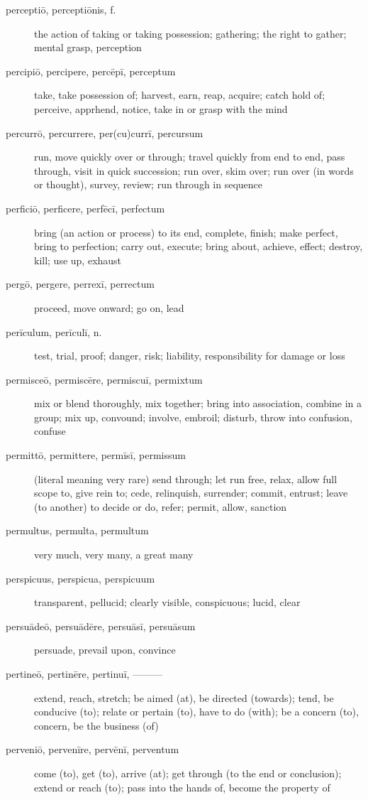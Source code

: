 \begin{description}
    \item[perceptiō, perceptiōnis, f.] the action of taking or taking possession; gathering; the right to gather; mental grasp, perception
    \item[percipiō, percipere, percēpī, perceptum] take, take possession of; harvest, earn, reap, acquire; catch hold of; perceive, apprhend, notice, take in or grasp with the mind
    \item[percurrō, percurrere, per(cu)currī, percursum] run, move quickly over or through; travel quickly from end to end, pass through, visit in quick succession; run over, skim over; run over (in words or thought), survey, review; run through in sequence
    \item[perficiō, perficere, perfēcī, perfectum] bring (an action or process) to its end, complete, finish; make perfect, bring to perfection; carry out, execute; bring about, achieve, effect; destroy, kill; use up, exhaust
    \item[pergō, pergere, perrexī, perrectum] \marginnote{*}proceed, move onward; go on, lead
    \item[perīculum, perīculī, n.] \marginnote{*}test, trial, proof; danger, risk; liability, responsibility for damage or loss
    \item[permisceō, permiscēre, permiscuī, permixtum] mix or blend thoroughly, mix together; bring into association, combine in a group; mix up, convound; involve, embroil; disturb, throw into confusion, confuse
    \item[permittō, permittere, permīsī, permissum] \marginnote{*}(literal meaning very rare) send through; let run free, relax, allow full scope to, give rein to; cede, relinquish, surrender; commit, entrust; leave (to another) to decide or do, refer; permit, allow, sanction
    \item[permultus, permulta, permultum] very much, very many, a great many
    \item[perspicuus, perspicua, perspicuum] transparent, pellucid; clearly visible, conspicuous; lucid, clear
    \item[persuādeō, persuādēre, persuāsī, persuāsum] \marginnote{*}persuade, prevail upon, convince
    \item[pertineō, pertinēre, pertinuī, ———] \marginnote{*}extend, reach, stretch; be aimed (at), be directed (towards); tend, be conducive (to); relate or pertain (to), have to do (with); be a concern (to), concern, be the business (of)
    \item[perveniō, pervenīre, pervēnī, perventum] \marginnote{*}come (to), get (to), arrive (at); get through (to the end or conclusion); extend or reach (to); pass into the hands of, become the property of

\end{description}
